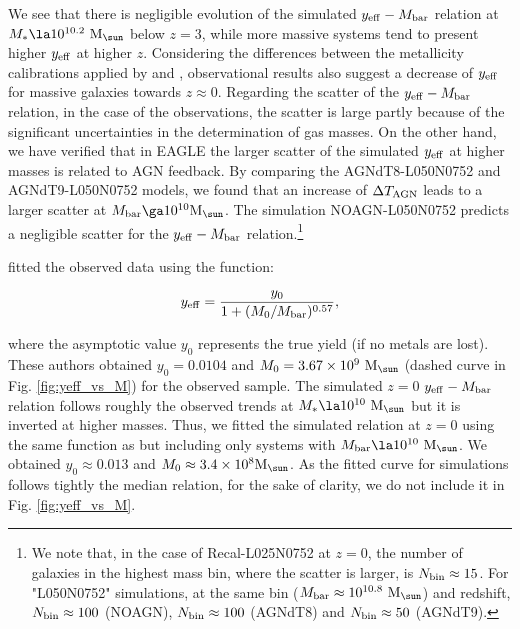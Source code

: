 \documentclass[useAMS,usenatbib]{mn2e}
\begin{document}
We see that there is negligible evolution of the simulated $y_{\rm eff} - M_{\rm bar}$ relation 
at $M_* \la 10^{10.2} \ {\rm M}_{\sun}$ below $z=3$, while more massive systems tend to present higher $y_{\rm eff}$
at higher $z$. Considering the differences between the metallicity calibrations applied by \citet{tremonti2004}
and \citet{erb2006}, observational results also suggest a decrease of $y_{\rm eff}$ for massive galaxies
towards $z\approx0$.
Regarding the scatter of the $y_{\rm eff} - M_{\rm bar}$ relation, in the case of the observations, 
the scatter is large partly because of the significant uncertainties in the determination of gas masses.
On the other hand, we have verified that in {\sc EAGLE} the larger scatter of the simulated $y_{\rm eff}$ at higher
masses is related to AGN feedback. By comparing the AGNdT8-L050N0752 and AGNdT9-L050N0752 models, 
we found that an increase of $\Delta T_{\rm AGN}$ leads to a larger scatter 
at $M_{\rm bar} \ga 10^{10} {\rm M}_{\sun}$. The simulation NOAGN-L050N0752 predicts a negligible scatter 
for the $y_{\rm eff} - M_{\rm bar}$ relation.\footnote{
We note that, in the case of Recal-L025N0752 at $z=0$, the number of galaxies in the highest mass
bin, where the scatter is larger, is $N_{\rm bin} \approx 15$.
For "L050N0752" simulations, at the same bin ($M_{\rm bar} \approx 10^{10.8} \ {\rm M_{\sun}}$) and redshift, 
$N_{\rm bin} \approx 100$ (NOAGN), $N_{\rm bin} \approx 100$ (AGNdT8) and $N_{\rm bin} \approx 50$ (AGNdT9). 
}

\citet{tremonti2004} fitted the observed data using the function:

\begin{equation}
\label{eq:yields_fit}
y_{\rm eff} = \frac{ y_0 }{1 + (M_0 / M_{\rm bar})^{0.57} },
\end{equation}

\noindent
where the asymptotic value $y_0$ represents the true yield (if no metals are lost).
These authors obtained $y_0 = 0.0104$ and $M_0 = 3.67 \times 10^9 \ {\rm M}_{\sun}$ (dashed curve in 
Fig. \ref{fig:yeff_vs_M}) for the observed sample.
The simulated $z=0$ $y_{\rm eff} - M_{\rm bar}$ relation follows roughly the observed trends
at $M_* \la 10^{10} \ {\rm M}_{\sun}$ but it is inverted at higher masses.
Thus, we fitted the simulated relation at $z=0$ using the same function as \citet{tremonti2004}
but including only systems with $M_{\rm bar} \la 10^{10} \ {\rm M}_{\sun}$.
We obtained $y_0 \approx 0.013$ and $M_0 \approx 3.4 \times 10^8 {\rm M}_{\sun}$.
As the fitted curve for simulations follows tightly the median relation, 
for the sake of clarity, we do not include it in 
Fig. \ref{fig:yeff_vs_M}.
\end{document}
